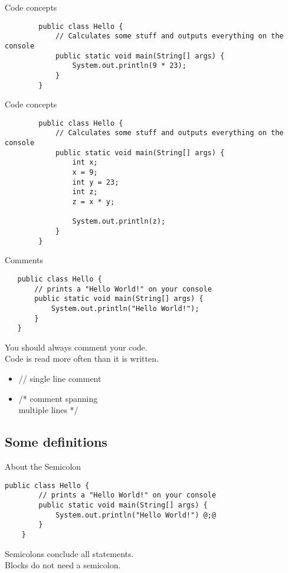\begin{frame}[fragile]{Code concepts}
	\begin{lstlisting}
		public class Hello {
			// Calculates some stuff and outputs everything on the console
			public static void main(String[] args) {
				System.out.println(9 * 23);
			}
		}
	\end{lstlisting}
\end{frame}

\begin{frame}[fragile]{Code concepts}
	\begin{lstlisting}
		public class Hello {
			// Calculates some stuff and outputs everything on the console
			public static void main(String[] args) {	        
				int x;
				x = 9;
				int y = 23;
				int z;
				z = x * y;
				
				System.out.println(z);
			}
		}
	\end{lstlisting}
\end{frame}

\begin{frame}[fragile]{Comments}
   \begin{lstlisting}
   public class Hello {
       // prints a "Hello World!" on your console
       public static void main(String[] args) {
           System.out.println("Hello World!");
       }
   }
   \end{lstlisting}
   You should always comment your code. \\
   Code is read more often than it is written.
   \begin{itemize}
       \item // single line comment
       \item /* comment spanning \\
           multiple lines */
   \end{itemize}
\end{frame}

\subsection{Some definitions}

\begin{frame}[fragile]{About the Semicolon}
	\begin{lstlisting}[style=base]
	public class Hello {
	    // prints a "Hello World!" on your console
	    public static void main(String[] args) {
	        System.out.println("Hello World!") @;@
	    }
	}
	\end{lstlisting}
	Semicolons conclude all statements. \\
	Blocks do not need a semicolon.
\end{frame}

